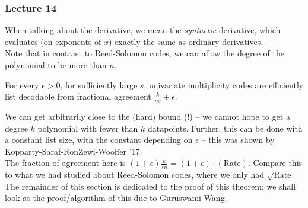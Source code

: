 	\subsubsection{Lecture 14}

		When talking about the derivative, we mean the \emph{syntactic} derivative, which evaluates (on exponents of $x$) exactly the same as ordinary derivatives.\\
		Note that in contrast to Reed-Solomon codes, we can allow the degree of the polynomial to be more than $n$.\\

		\begin{ftheo}
			For every $\epsilon > 0$, for sufficiently large $s$, univariate multiplicity codes are efficiently list decodable from fractional agreement $\frac{k}{ns} + \epsilon$.
		\end{ftheo}
		We can get arbitrarily close to the (hard) bound (!) -- we cannot hope to get a degree $k$ polynomial with fewer than $k$ datapoints. Further, this can be done with a constant list size, with the constant depending on $\epsilon$ -- this was shown by Kopparty-Saraf-RonZewi-Wooffer '17. \\
		The fraction of agreement here is $(1+\epsilon)\frac{k}{sn} = (1+\epsilon) \cdot (\text{Rate})$. Compare this to what we had studied about Reed-Solomon codes, where we only had $\sqrt{\text{Rate}}$.\\

		The remainder of this section is dedicated to the proof of this theorem; we shall look at the proof/algorithm of this due to Guruswami-Wang.\\

